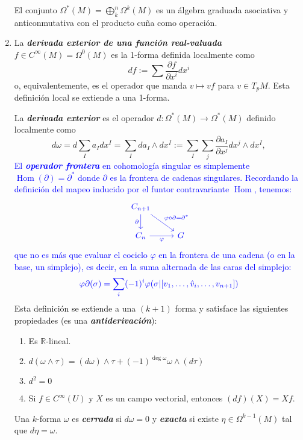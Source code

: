 \documentclass[spanish]{article}
\theoremstyle{definition}
\newcommand{\R}{\mathbb{R}}
\newcommand{\Cinf}{C^\infty}
\DeclareMathOperator{\Hom}{Hom}
\begin{document}
\begin{enumerate}
		El conjunto $\Omega^*(M)=\bigoplus_k^n\Omega^k(M)$ es un álgebra graduada asociativa y anticonmutativa con el producto cuña como operación.
		
		
		\item La \textbf{\textit{derivada exterior de una función real-valuada}} $f\in\Cinf(M)=\Omega^0(M)$ es la 1-forma definida localmente como
		\[df:=\sum\frac{\partial f}{\partial x^i}dx^i\]
		o, equivalentemente, es el operador que manda $v\mapsto vf$ para $v\in T_pM$. Esta definición local se extiende a una 1-forma.
		
		La \textbf{\textit{derivada exterior}} es el operador $d:\Omega^*(M)\to\Omega^*(M)$ definido localmente como
		\[d\omega=d\sum_Ia_Idx^I =\sum_Ida_I\wedge dx^I:=\sum_I\sum_j\frac{\partial a_I}{\partial x^j}dx^j\wedge dx^I,\]
		\textcolor{blue}{El \textbf{\textit{operador frontera}} en cohomología singular es simplemente $\Hom(\partial)=\partial^*$ donde $\partial$ es la frontera de cadenas singulares. Recordando la definición del mapeo inducido por el funtor contravariante $\Hom$, tenemos:}
		\[\begin{tikzcd}
			\textcolor{blue}{C_{n+1}}\arrow[d,blue,swap,"\partial"]\arrow[rd,blue,"\varphi\circ\partial=\partial^*"]\\	\textcolor{blue}{C_n}\arrow[blue,swap,r,"\varphi"]&\textcolor{blue}{G}
		\end{tikzcd}\]
		\textcolor{blue}{que no es más que evaluar el cociclo $\varphi$ en la frontera de una cadena (o en la base, un simplejo), es decir, en la suma alternada de las caras del simplejo:}
		\[\color{blue}\varphi\partial (\sigma)=\sum_i(-1)^i\varphi(\sigma|[v_1,\ldots,\hat{v}_i,\ldots,v_{n+1}])\]
		Esta definición se extiende a una $(k+1)$ forma y satisface las siguientes propiedades (es una \textbf{\textit{antiderivación}}):
		\begin{enumerate}
			\item Es $\R$-lineal.
			\item $d(\omega\wedge\tau)=(d\omega)\wedge\tau+(-1)^{\deg\omega}\omega\wedge(d\tau)$
			\item $d^2=0$
			\item Si $f\in\Cinf(U)$ y $X$ es un campo vectorial, entonces $(df)(X)=Xf$.
			
			
		\end{enumerate}
		Una $k$-forma $\omega$ es \textbf{\textit{cerrada}} si $d\omega=0$ y \textbf{\textit{exacta}} si existe $\eta\in\Omega^{k-1}(M)$ tal que $d\eta=\omega$.
		


\end{enumerate}
\end{document}
